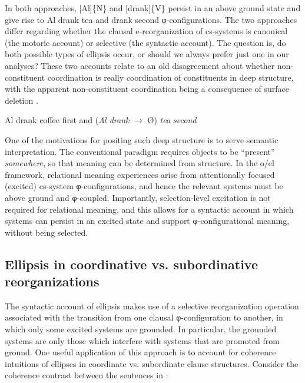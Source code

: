   In both approaches, [Al]\{N\} and [drank]\{V\} persist in an above ground state and give rise to {\textbar}Al drank tea{\textbar} and {\textbar}drank second{\textbar} φ-configurations. The two approaches differ regarding whether the clausal e-reorganization of cs-systems is canonical (the motoric account) or selective (the syntactic account). The question is, do both possible types of ellipsis occur, or should we always prefer just one in our analyses? These two accounts relate to an old disagreement about whether non-constituent coordination is really coordination of constituents in deep structure, with the apparent non-constituent coordination being a consequence of surface deletion \citep{DalrympleEtAl1991,Merchant2001,SagEtAl1985}. 

  \ea\label{ex:7:2x}
{Al drank coffee first and} (\textit{Al drank} $\rightarrow$ Ø) \textit{tea second}
\z

  One of the motivations for positing such deep structure is to serve semantic interpretation. The conventional paradigm requires objects to be “present” \textit{somewhere}, so that meaning can be determined from structure. In the o/el framework, relational meaning experiences arise from attentionally focused (excited) cs-system φ-configurations, and hence the relevant systems must be above ground and φ-coupled. Importantly, selection-level excitation is not required for relational meaning, and this allows for a syntactic account in which systems can persist in an excited state and support φ-configurational meaning, without being selected. 

\subsection{Ellipsis in coordinative vs. subordinative reorganizations}

The syntactic account of ellipsis makes use of a selective reorganization operation associated with the transition from one clausal φ-configuration to another, in which only some excited systems are grounded. In particular, the grounded systems are only those which interfere with systems that are promoted from ground. One useful application of this approach is to account for coherence intuitions of ellipses in coordinate vs. subordinate clause structures. Consider the coherence contrast between the sentences in :

\ea\label{ex:7:3}
   \label{ex:7:3a}
\label{ex:7:3b}
\z
\z
\judgewidth{*}

